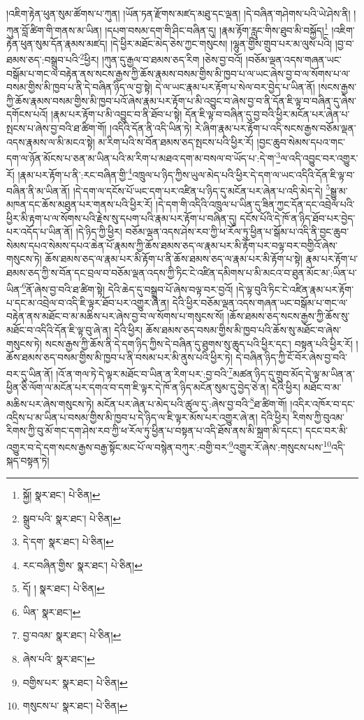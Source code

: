 །འཇིག་རྟེན་ཕུན་སུམ་ཚོགས་པ་ཀུན། །ཡོན་ཏན་རྫོགས་མཛད་མཐུ་དང་ལྡན། །དེ་བཞིན་གཤེགས་པའི་ཡེ་ཤེས་ནི། །ཀུན་བློ་ཚིག་གི་གནས་མ་ཡིན། །དཔག་བསམ་དག་གི་ཤིང་བཞིན་དུ། །རྣམ་རྟོག་རླུང་གིས་ཐུབ་མི་བསྐྱོད།\footnote{སྐྱོ།  སྣར་ཐང་།  པེ་ཅིན། } །འཇིག་རྟེན་ཕུན་སུམ་དོན་རྣམས་མཛད། །དེ་ཕྱིར་མཐོང་མེད་ཅེས་ཀྱང་གསུངས། །ལྷུན་གྱིས་གྲུབ་པར་མ་ལུས་པའི། །བྱ་བ་ཐམས་ཅད་:བསྒྲུབ་པའི་\footnote{སྒྲུབ་པའི་  སྣར་ཐང་།  པེ་ཅིན། }ཕྱིར། །ཀུན་དུ་རྒྱལ་བ་ཐམས་ཅད་རིག །ཅེས་བྱ་བའོ། །བཅོམ་ལྡན་འདས་གཞན་ཡང་བསྒོམ་པ་གང་ལ་བརྟེན་ནས་སངས་རྒྱས་ཀྱི་ཆོས་རྣམས་བསམ་གྱིས་མི་ཁྱབ་པ་ལ་ཡང་ཞེས་བྱ་བ་ལ་སོགས་པ་ལ་བསམ་གྱིས་མི་ཁྱབ་པ་ནི་དེ་བཞིན་ཉིད་ལ་བྱ་སྟེ། དེ་ལ་ཡང་རྣམ་པར་རྟོག་པ་སེལ་བར་བྱེད་པ་ཡིན་ནོ། །སངས་རྒྱས་ཀྱི་ཆོས་རྣམས་བསམ་གྱིས་མི་ཁྱབ་པའོ་ཞེས་རྣམ་པར་རྟོག་པ་མི་འབྱུང་བ་ཞེས་བྱ་བ་ནི་དོན་ཇི་ལྟ་བ་བཞིན་དུ་ཞེས་དགོངས་པའོ། །རྣམ་པར་རྟོག་པ་མི་འབྱུང་བ་ནི་ཐོབ་པ་སྟེ། དོན་ཇི་ལྟ་བ་བཞིན་དུ་བྱ་བའི་ཕྱིར་མངོན་པར་ཞེན་པ་སྤངས་པ་ཞེས་བྱ་བའི་ཐ་ཚིག་གོ། །འདིའི་དོན་ནི་འདི་ཡིན་ཏེ། རེ་ཞིག་རྣམ་པར་རྟོག་པ་འདི་སངས་རྒྱས་བཅོམ་ལྡན་འདས་རྣམས་ལ་མི་མངའ་སྟེ། མ་རིག་པའི་ས་བོན་ཐམས་ཅད་སྤངས་པའི་ཕྱིར་རོ། །བྱང་ཆུབ་སེམས་དཔའ་གང་དག་ལ་ཉོན་མོངས་པ་ཅན་མ་ཡིན་པའི་མ་རིག་པ་མཐའ་དག་མ་བསལ་བ་ཡོད་པ་:དེ་ག་\footnote{དེ་དག་  སྣར་ཐང་།  པེ་ཅིན། }ལ་འདི་འབྱུང་བར་འགྱུར་རོ། །རྣམ་པར་རྟོག་པ་ནི་:རང་བཞིན་གྱི་\footnote{རང་བཞིན་གྱིས་  སྣར་ཐང་།  པེ་ཅིན། }འཁྲུལ་པ་ཉིད་ཀྱིས་ཡུལ་མེད་པའི་ཕྱིར་དེ་དག་ལ་ཡང་འདིའི་དོན་ཇི་ལྟ་བ་བཞིན་ནི་མ་ཡིན་ནོ། །དེ་དག་ལ་དངོས་པོ་ཡང་དག་པར་འཛིན་པ་ཉིད་དུ་མངོན་པར་ཞེན་པ་འདི་མེད་དེ། \footnote{དོ། །   སྣར་ཐང་།  པེ་ཅིན། }སྒྱུ་མ་མཁན་དང་ཆོས་མཐུན་པར་གནས་པའི་ཕྱིར་རོ། །དེ་དག་གི་འདིའི་འཁྲུལ་པ་ཡིན་དུ་ཟིན་ཀྱང་དོན་དང་འབྲེལ་པའི་ཕྱིར་མི་རྟག་པ་ལ་སོགས་པའི་རྗེས་སུ་དཔག་པའི་རྣམ་པར་རྟོག་པ་བཞིན་དུ། དངོས་པོའི་དེ་ཁོ་ན་ཉིད་ཐོབ་པར་བྱེད་པར་འདོད་པ་ཡིན་ནོ། །དེ་ཉིད་ཀྱི་ཕྱིར། བཅོམ་ལྡན་འདས་ཤེས་རབ་ཀྱི་ཕ་རོལ་ཏུ་ཕྱིན་པ་སྒོམ་པ་འདི་ནི་བྱང་ཆུབ་སེམས་དཔའ་སེམས་དཔའ་ཆེན་པོ་རྣམས་ཀྱི་ཆོས་ཐམས་ཅད་ལ་རྣམ་པར་མི་རྟོག་པར་བལྟ་བར་བགྱིའོ་ཞེས་གསུངས་ཏེ། ཆོས་ཐམས་ཅད་ལ་རྣམ་པར་མི་རྟོག་པ་ནི་ཆོས་ཐམས་ཅད་ལ་རྣམ་པར་མི་རྟོག་པ་སྟེ། རྣམ་པར་རྟོག་པ་ཐམས་ཅད་ཀྱི་ས་བོན་དང་བྲལ་བ་བཅོམ་ལྡན་འདས་ཀྱི་ཏིང་ངེ་འཛིན་དམིགས་པ་མི་མངའ་བ་ཐུན་མོང་མ་:ཡིན་པ་ཡིན་\footnote{ཡིན་  སྣར་ཐང་། }ནོ་ཞེས་བྱ་བའི་ཐ་ཚིག་སྟེ། དེའི་ཆེད་དུ་བསྒྲུབ་པོ་ཞེས་བལྟ་བར་བྱའོ། །དེ་ལྟ་བུའི་ཏིང་ངེ་འཛིན་རྣམ་པར་རྟོག་པ་དང་མ་འབྲེལ་བ་འདི་ཇི་ལྟར་ཐོབ་པར་འགྱུར་ཞེ་ན། དེའི་ཕྱིར་བཅོམ་ལྡན་འདས་གཞན་ཡང་བསྒོམ་པ་གང་ལ་བརྟེན་ནས་མཐོང་བ་མ་མཆིས་པར་ཞེས་བྱ་བ་ལ་སོགས་པ་གསུངས་སོ། །ཆོས་ཐམས་ཅད་སངས་རྒྱས་ཀྱི་ཆོས་སུ་མཐོང་བ་འདིའི་དོན་ཇི་ལྟ་བུ་ཞེ་ན། དེའི་ཕྱིར། ཆོས་ཐམས་ཅད་བསམ་གྱིས་མི་ཁྱབ་པའི་ཆོས་སུ་མཐོང་བ་ཞེས་གསུངས་ཏེ། སངས་རྒྱས་ཀྱི་ཆོས་ནི་དེ་དག་ཉིད་ཀྱིས་དེ་བཞིན་དུ་ཐུགས་སུ་ཆུད་པའི་ཕྱིར་དང་། བསྟན་པའི་ཕྱིར་རོ། །ཆོས་ཐམས་ཅད་བསམ་གྱིས་མི་ཁྱབ་པ་ནི་བསམ་པར་མི་ནུས་པའི་ཕྱིར་ཏེ། དེ་བཞིན་ཉིད་ཀྱི་ངོ་བོར་ཞེས་བྱ་བའི་བར་དུ་ཡིན་ནོ། །འོ་ན་གལ་ཏེ་དེ་ལྟར་མཐོང་བ་ཡིན་ན་རིག་པར་:བྱ་བའི་\footnote{བྱ་བའམ་  སྣར་ཐང་།  པེ་ཅིན། }མཚན་ཉིད་དུ་གྲུབ་མོད་དེ་ལྟ་མ་ཡིན་ན་ཕྱིན་ཅི་ལོག་ལ་མངོན་པར་དགའ་བ་དག་ཇི་ལྟར་དེ་ཁོ་ན་ཉིད་མངོན་སུམ་དུ་བྱེད་ཅེ་ན། དེའི་ཕྱིར། མཐོང་བ་མ་མཆིས་པར་ཞེས་གསུངས་ཏེ། མངོན་པར་ཞེན་པ་མེད་པའི་ཚུལ་དུ་:ཞེས་བྱ་བའི་\footnote{ཞེས་པའི་  སྣར་ཐང་། }ཐ་ཚིག་གོ། །འདིར་འཁོར་བ་དང་འདྲིས་པ་མ་ཡིན་པ་བསམ་གྱིས་མི་ཁྱབ་པ་དེ་ཉིད་ལ་ཇི་ལྟར་མོས་པར་འགྱུར་ཞེ་ན། དེའི་ཕྱིར། རིགས་ཀྱི་བུའམ་རིགས་ཀྱི་བུ་མོ་གང་དག་ཤེས་རབ་ཀྱི་ཕ་རོལ་ཏུ་ཕྱིན་པ་བསྟན་པ་འདི་ཐོས་ནས་མི་སྐྲག་མི་དངང་། དངང་བར་མི་འགྱུར་བ་དེ་དག་སངས་རྒྱས་བརྒྱ་སྟོང་མང་པོ་ལ་བསྙེན་བཀུར་:བགྱི་བར་\footnote{བགྱིས་པར་  སྣར་ཐང་།  པེ་ཅིན། }འགྱུར་རོ་ཞེས་:གསུངས་པས་\footnote{གསུངས་པ་  སྣར་ཐང་།  པེ་ཅིན། }འདི་སྐད་བསྟན་ཏེ། 